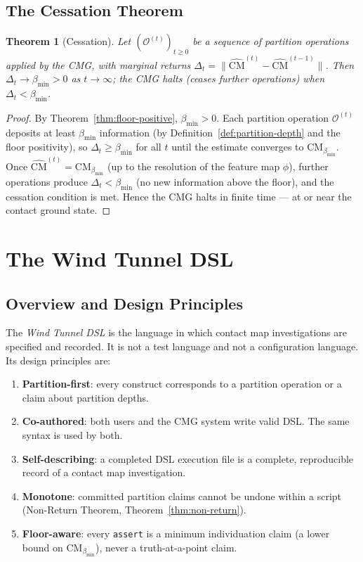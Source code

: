 \documentclass[12pt,a4paper,twocolumn]{article}
\theoremstyle{plain}
\newtheorem{theorem}{Theorem}[section]
\theoremstyle{definition}
\theoremstyle{remark}
\newcommand{\CM}{\mathrm{CM}}
\newcommand{\bmin}{\beta_{\min}}
\newcommand{\CMbmin}{\CM_{\bmin}}
\begin{document}
\subsection{The Cessation Theorem}

\begin{theorem}[Cessation]
\label{thm:cessation}
Let $(\mathcal{O}^{(t)})_{t \geq 0}$ be a sequence of partition operations
applied by the CMG, with marginal returns $\Delta_t = \|\hat{\CM}^{(t)} -
\hat{\CM}^{(t-1)}\|$.  Then $\Delta_t \to \bmin > 0$ as $t \to \infty$;
the CMG halts (ceases further operations) when $\Delta_t < \bmin$.
\end{theorem}

\begin{proof}
By Theorem~\ref{thm:floor-positive}, $\bmin > 0$.  Each partition operation
$\mathcal{O}^{(t)}$ deposits at least $\bmin$ information (by
Definition~\ref{def:partition-depth} and the floor positivity), so $\Delta_t
\geq \bmin$ for all $t$ until the estimate converges to $\CMbmin$.  Once
$\hat{\CM}^{(t)} = \CMbmin$ (up to the resolution of the feature map $\phi$),
further operations produce $\Delta_t < \bmin$ (no new information above
the floor), and the cessation condition is met.  Hence the CMG halts in
finite time --- at or near the contact ground state.
\end{proof}

\section{The Wind Tunnel DSL}
\label{sec:dsl}

\subsection{Overview and Design Principles}

The \emph{Wind Tunnel DSL} is the language in which contact map
investigations are specified and recorded.  It is not a test language and not
a configuration language.  Its design principles are:

\begin{enumerate}[label=(\roman*)]
  \item \textbf{Partition-first}: every construct corresponds to a partition
    operation or a claim about partition depths.
  \item \textbf{Co-authored}: both users and the CMG system write valid DSL.
    The same syntax is used by both.
  \item \textbf{Self-describing}: a completed DSL execution file is a
    complete, reproducible record of a contact map investigation.
  \item \textbf{Monotone}: committed partition claims cannot be undone within
    a script (Non-Return Theorem, Theorem~\ref{thm:non-return}).
  \item \textbf{Floor-aware}: every \texttt{assert} is a minimum individuation
    claim (a lower bound on $\CMbmin$), never a truth-at-a-point claim.
\end{enumerate}
\end{document}
